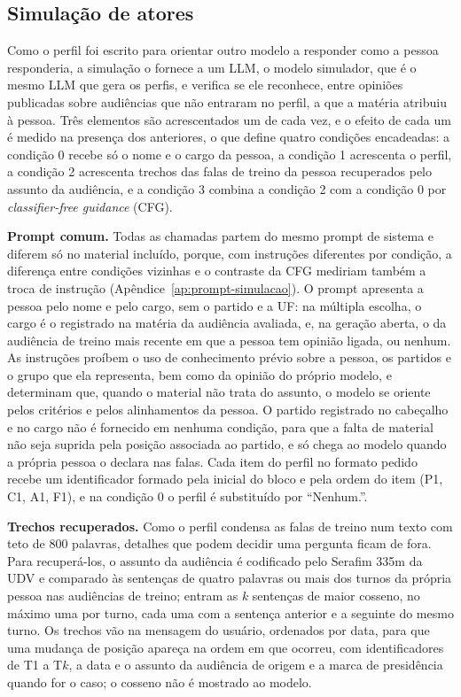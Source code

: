 
\subsection{Simulação de atores}
\label{sec:metodo-simulacao}

Como o perfil foi escrito para orientar outro modelo a responder como a pessoa responderia, a
simulação o fornece a um LLM, o modelo simulador, que é o mesmo LLM que gera os perfis, e verifica se
ele reconhece, entre opiniões publicadas sobre audiências que não entraram no perfil, a que a matéria
atribuiu à pessoa. Três elementos são acrescentados um de cada vez, e o efeito de cada um é medido na
presença dos anteriores, o que define quatro condições encadeadas: a condição 0 recebe só o nome e o
cargo da pessoa, a condição 1 acrescenta o perfil, a condição 2 acrescenta trechos das falas de
treino da pessoa recuperados pelo assunto da audiência, e a condição 3 combina a condição 2 com a
condição 0 por \textit{classifier-free guidance} (CFG).

\textbf{Prompt comum.} Todas as chamadas partem do mesmo prompt de sistema e diferem só no material
incluído, porque, com instruções diferentes por condição, a diferença entre condições vizinhas e o
contraste da CFG mediriam também a troca de instrução (Apêndice~\ref{ap:prompt-simulacao}). O prompt
apresenta a pessoa pelo nome e pelo cargo, sem o partido e a UF: na múltipla escolha, o cargo é o
registrado na matéria da audiência avaliada, e, na geração aberta, o da audiência de treino mais
recente em que a pessoa tem opinião ligada, ou nenhum. As instruções proíbem o uso de conhecimento
prévio sobre a pessoa, os partidos e o grupo que ela representa, bem como da opinião do próprio
modelo, e determinam que, quando o material não trata do assunto, o modelo se oriente pelos critérios
e pelos alinhamentos da pessoa. O partido registrado no cabeçalho e no cargo não é fornecido em
nenhuma condição, para que a falta de material não seja suprida pela posição associada ao partido, e
só chega ao modelo quando a própria pessoa o declara nas falas. Cada item do perfil no formato pedido
recebe um identificador formado pela inicial do bloco e pela ordem do item (P1, C1, A1, F1), e na
condição 0 o perfil é substituído por ``Nenhum.''.

\textbf{Trechos recuperados.} Como o perfil condensa as falas de treino num texto com teto de 800
palavras, detalhes que podem decidir uma pergunta ficam de fora. Para recuperá-los, o assunto da
audiência é codificado pelo Serafim 335m da UDV e comparado às sentenças de quatro palavras ou mais
dos turnos da própria pessoa nas audiências de treino; entram as $k$ sentenças de maior cosseno, no
máximo uma por turno, cada uma com a sentença anterior e a seguinte do mesmo turno. Os trechos vão
na mensagem do usuário, ordenados por data, para que uma mudança de posição apareça na ordem em que
ocorreu, com identificadores de T1 a T$k$, a data e o assunto da audiência de origem e a marca de
presidência quando for o caso; o cosseno não é mostrado ao modelo.

